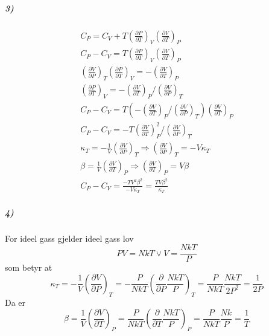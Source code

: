 \documentclass[11pt, A4paper, norsk]{article}
\begin{document}
			\subparagraph{3)}
				\begin{gather*}
C_P = C_V + T \left( \frac{\partial P}{\partial T} \right)_V \left( \frac{\partial V}{\partial T} \right)_P \\
C_P - C_V = T \left( \frac{\partial P}{\partial T} \right)_V \left( \frac{\partial V}{\partial T} \right)_P \\
\left( \frac{\partial V}{\partial P} \right)_T \left( \frac{\partial P}{\partial T} \right)_V = - \left( \frac{\partial V}{\partial T} \right)_P \\
\left( \frac{\partial P}{\partial T} \right)_V = - \left( \frac{\partial V}{\partial T} \right)_P / \left( \frac{\partial V}{\partial P} \right)_T \\
C_P - C_V = T \left( - \left( \frac{\partial V}{\partial T} \right)_P / \left( \frac{\partial V}{\partial P} \right)_T \right) \left( \frac{\partial V}{\partial T} \right)_P \\
C_P - C_V = - T \left( \frac{\partial V}{\partial T} \right)^2_P / \left( \frac{\partial V}{\partial P} \right)_T \\
\kappa_T = - \frac{1}{V} \left( \frac{\partial V}{\partial P} \right)_T \Rightarrow \left( \frac{\partial V}{\partial P} \right)_T = - V \kappa_T \\
\beta = \frac{1}{V} \left( \frac{\partial V}{\partial T} \right)_P \Rightarrow \left( \frac{\partial V}{\partial T} \right)_P = V \beta \\
C_P - C_V = \frac{- T V^2 \beta^2}{- V \kappa_T} = \frac{T V \beta^2}{\kappa_T}
				\end{gather*}








			\subparagraph{4)}
				\begin{flushleft}
For ideel gass gjelder ideel gass lov
$$PV = NkT \vee V = \frac{NkT}{P}$$ 
som betyr at
$$\kappa_T = - \frac{1}{V} \left( \frac{\partial V}{\partial P} \right)_T = - \frac{P}{NkT} \left( \frac{\partial}{\partial P} \frac{NkT}{P} \right)_T = \frac{P}{NkT} \frac{NkT}{2 P^2} = \frac{1}{2 P}$$
Da er
$$\beta = \frac{1}{V} \left( \frac{\partial V}{\partial T} \right)_P = \frac{P}{NkT} \left( \frac{\partial}{\partial T} \frac{NkT}{P} \right)_P = \frac{P}{NkT} \frac{Nk}{P} = \frac{1}{T}$$
				\end{flushleft}
\end{document}
